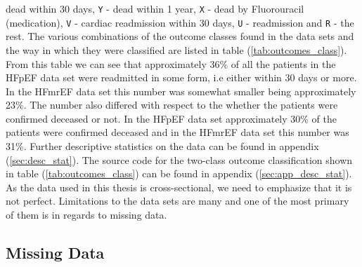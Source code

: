 \documentclass[../thesis.tex]{subfiles}
\begin{document}
\noindent dead within 30 days, \texttt{Y} - dead within 1 year, \texttt{X} - dead by Fluorouracil (medication), \texttt{V} - cardiac readmission within 30 days, \texttt{U} - readmission and \texttt{R} - the rest. The various combinations of the outcome classes found in the data sets and the way in which they were classified are listed in table (\ref{tab:outcomes_class}). From this table we can see that approximately 36\% of all the patients in the HFpEF data set were readmitted in some form, i.e either within 30 days or more. In the HFmrEF data set this number was somewhat smaller being approximately 23\%. The number also differed with respect to the whether the patients were confirmed deceased or not. In the HFpEF data set approximately 30\% of the patients were confirmed deceased and in the HFmrEF data set this number was 31\%. Further descriptive statistics on the data can be found in appendix (\ref{sec:desc_stat}). The source code for the two-class outcome classification shown in table (\ref{tab:outcomes_class}) can be found in appendix (\ref{sec:app_desc_stat}).\\
\indent As the data used in this thesis is cross-sectional, we need to emphasize that it is not perfect. Limitations to the data sets are many and one of the most primary of them is in regards to missing data.


\subsection{Missing Data}
\label{subsec:miss_data}
\end{document}
